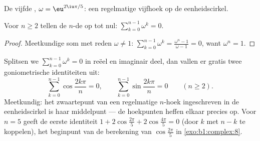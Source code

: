 \begin{omfigure}

{\small De vijfde , $\omega = \eu^{2\iu\pi/5}$: een
regelmatige vijfhoek op de eenheidscirkel.}
\end{omfigure}

\begin{proposition}\label{prop:b1:complex:sumroots}
Voor $n \geq 2$ tellen de $n$-de  op tot nul:
$\sum_{k=0}^{n-1} \omega^k = 0$.
\end{proposition}

\begin{proof}
Meetkundige som met reden $\omega \neq 1$: $\sum_{k=0}^{n-1} \omega^k =
\frac{\omega^n - 1}{\omega - 1} = 0$, want $\omega^n = 1$.
\end{proof}

\begin{example}\label{ex:b1:complex:sumrootsparts}
Splitsen we $\sum_{k=0}^{n-1}\omega^k = 0$ in reëel en imaginair deel,
dan vallen er gratis twee goniometrische identiteiten uit:
\[
\sum_{k=0}^{n-1}\cos\frac{2k\pi}n = 0,
\qquad
\sum_{k=0}^{n-1}\sin\frac{2k\pi}n = 0
\qquad (n \geq 2).
\]
Meetkundig: het zwaartepunt van een regelmatige $n$-hoek ingeschreven
in de eenheidscirkel is haar middelpunt --- de hoekpunten heffen
elkaar precies op. Voor $n = 5$ geeft de eerste identiteit $1 +
2\cos\frac{2\pi}5 + 2\cos\frac{4\pi}5 = 0$ (door $k$ met $n - k$ te
koppelen), het beginpunt van de berekening van $\cos\frac{2\pi}5$ in
\cref{exo:b1:complex:8}.
\end{example}

